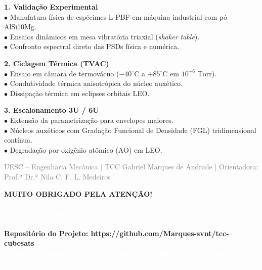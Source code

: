 \documentclass[11pt]{article}
\newcommand{\slidefooter}{
    \vfill
    \noindent
    \begin{minipage}{\textwidth}
        \centering
        \scriptsize \textcolor{gray}{UESC -- Engenharia Mecânica | TCC Gabriel Marques de Andrade | Orientadora: Prof.ª Dr.ª Nila C. F. L. Medeiros}
    \end{minipage}
}
\begin{document}
\begin{minipage}[t]{0.31\textwidth}
    \textbf{\textcolor{NavyAccent}{1. Validação Experimental}}\\[0.2cm]
    \small
    $\bullet$ Manufatura física de espécimes L-PBF em máquina industrial com pó AlSi10Mg.\\
    $\bullet$ Ensaios dinâmicos em mesa vibratória triaxial (\textit{shaker table}).\\
    $\bullet$ Confronto espectral direto das PSDs física e numérica.
\end{minipage}
\hfill
\begin{minipage}[t]{0.31\textwidth}
    \textbf{\textcolor{NavyAccent}{2. Ciclagem Térmica (TVAC)}}\\[0.2cm]
    \small
    $\bullet$ Ensaio em câmara de termovácuo ($-40^\circ\text{C}$ a $+85^\circ\text{C}$ em $10^{-6}\text{ Torr}$).\\
    $\bullet$ Condutividade térmica anisotrópica do núcleo auxético.\\
    $\bullet$ Dissipação térmica em eclipses orbitais LEO.
\end{minipage}
\hfill
\begin{minipage}[t]{0.31\textwidth}
    \textbf{\textcolor{NavyAccent}{3. Escalonamento 3U / 6U}}\\[0.2cm]
    \small
    $\bullet$ Extensão da parametrização para envelopes maiores.\\
    $\bullet$ Núcleos auxéticos com Gradação Funcional de Densidade (FGL) tridimensional contínua.\\
    $\bullet$ Degradação por oxigênio atômico (AO) em LEO.
\end{minipage}

\slidefooter
\clearpage

\noindent
\colorbox{SpaceNavy}{
    \parbox[c][12.2cm][c]{\dimexpr\textwidth-2\fboxsep\relax}{
        \centering
        \vspace{1.2cm}
        {\Huge \textbf{\textcolor{SpaceGold}{MUITO OBRIGADO PELA ATENÇÃO!}}}\\[1.0cm]
        {\normalsize \textbf{\textcolor{white}{Agradecimentos à Universidade Estadual de Santa Cruz (UESC), ao Colegiado de Engenharia Mecânica}}}\\[0.2cm]
        {\normalsize \textbf{\textcolor{white}{e à orientadora Prof.ª Dr.ª Nila Cecília de Faria Lopes Medeiros.}}}\\[1.0cm]
        {\small \textbf{\textcolor{SpaceGold}{Repositório do Projeto: https://github.com/Marques-svnt/tcc-cubesats}}}\\[0.6cm]
        {\large \textbf{\textcolor{white}{Estamos à disposição para a arguição e considerações da banca examinadora.}}}
        \vspace{1.2cm}
    }
}
\end{document}
